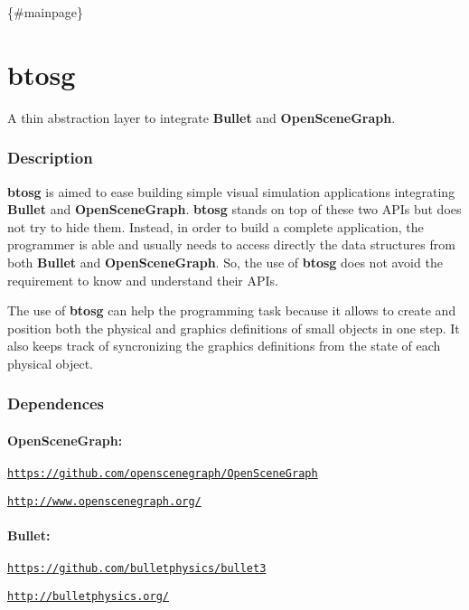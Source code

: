 \{\#mainpage\} \section*{btosg}

A thin abstraction layer to integrate {\bfseries Bullet} and {\bfseries Open\+Scene\+Graph}.

\subsubsection*{Description}

{\bfseries btosg} is aimed to ease building simple visual simulation applications integrating {\bfseries Bullet} and {\bfseries Open\+Scene\+Graph}. {\bfseries btosg} stands on top of these two A\+P\+Is but does not try to hide them. Instead, in order to build a complete application, the programmer is able and usually needs to access directly the data structures from both {\bfseries Bullet} and {\bfseries Open\+Scene\+Graph}. So, the use of {\bfseries btosg} does not avoid the requirement to know and understand their A\+P\+Is.

The use of {\bfseries btosg} can help the programming task because it allows to create and position both the physical and graphics definitions of small objects in one step. It also keeps track of syncronizing the graphics definitions from the state of each physical object.

\subsubsection*{Dependences}

\paragraph*{Open\+Scene\+Graph\+:}


\begin{DoxyItemize}
\item \href{https://github.com/openscenegraph/OpenSceneGraph}{\tt https\+://github.\+com/openscenegraph/\+Open\+Scene\+Graph}
\item \href{http://www.openscenegraph.org/}{\tt http\+://www.\+openscenegraph.\+org/} \paragraph*{Bullet\+:}
\end{DoxyItemize}


\begin{DoxyItemize}
\item \href{https://github.com/bulletphysics/bullet3}{\tt https\+://github.\+com/bulletphysics/bullet3}
\item \href{http://bulletphysics.org/}{\tt http\+://bulletphysics.\+org/}
\end{DoxyItemize}

